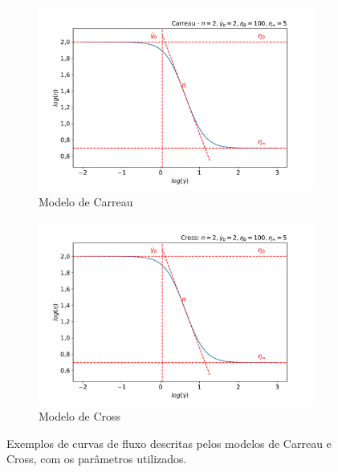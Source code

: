 \begin{apendicesenv}
\begin{figure}[H]
	\begin{subfigure}[t]{0.45\textwidth}
		\centering
		\includegraphics[width=\textwidth]{./imagens/reologia/Carreau}
		\caption{Modelo de Carreau}
		\label{fig:reologia_modelo_carreau}
	\end{subfigure} \qquad %
	\begin{subfigure}[t]{0.45\textwidth}
		\centering
		\includegraphics[width=\textwidth]{./imagens/reologia/Cross}
		\caption{Modelo de Cross}
		\label{fig:reologia_modelo_cross}
	\end{subfigure}
	\caption{Exemplos de curvas de fluxo descritas pelos modelos de Carreau e Cross, com os parâmetros utilizados.}
	\label{fig:reologia_modelos}
\end{figure}


\end{apendicesenv}
